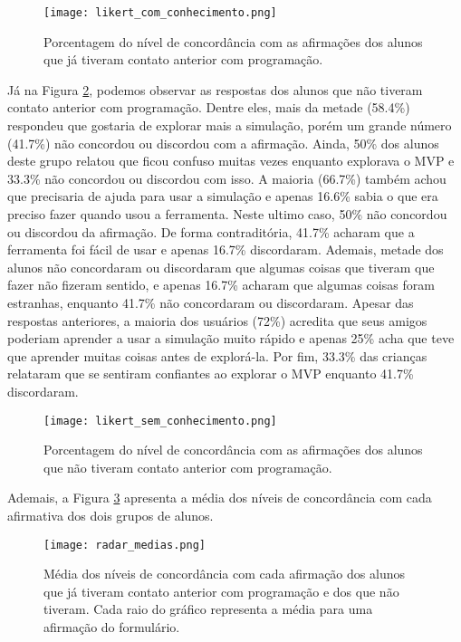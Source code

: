 \begin{figure}[h!]
    \centering
    \texttt{[image: likert\_com\_conhecimento.png]}
    \caption{Porcentagem do nível de concordância com as afirmações dos alunos que já tiveram contato anterior com programação.}
    \label{figure:likert_sim}
\end{figure}

Já na Figura \ref{figure:likert_nao}, podemos observar as respostas dos alunos que não tiveram contato anterior com programação. Dentre eles, mais da metade (58.4\%) respondeu que gostaria de explorar mais a simulação, porém um grande número (41.7\%) não concordou ou discordou com a afirmação. Ainda, 50\% dos alunos deste grupo relatou que ficou confuso muitas vezes enquanto explorava o MVP e 33.3\% não concordou ou discordou com isso. A maioria (66.7\%) também achou que precisaria de ajuda para usar a simulação e apenas 16.6\% sabia o que era preciso fazer quando usou a ferramenta. Neste ultimo caso, 50\% não concordou ou discordou da afirmação. De forma contraditória, 41.7\% acharam que a ferramenta foi fácil de usar e apenas 16.7\% discordaram. Ademais, metade dos alunos não concordaram ou discordaram que algumas coisas que tiveram que fazer não fizeram sentido, e apenas 16.7\% acharam que algumas coisas foram estranhas, enquanto 41.7\% não concordaram ou discordaram. Apesar das respostas anteriores, a maioria dos usuários (72\%) acredita que seus amigos poderiam aprender a usar a simulação muito rápido e apenas 25\% acha que teve que aprender muitas coisas antes de explorá-la. Por fim, 33.3\% das crianças relataram que se sentiram confiantes ao explorar o MVP enquanto 41.7\% discordaram.

\begin{figure}[h!]
    \centering
    \texttt{[image: likert\_sem\_conhecimento.png]}
    \caption{Porcentagem do nível de concordância com as afirmações dos alunos que não tiveram contato anterior com programação.}
    \label{figure:likert_nao}
\end{figure}

Ademais, a Figura \ref{figure:radar_medias} apresenta a média dos níveis de concordância com cada afirmativa dos dois grupos de alunos.

\begin{figure}[h!]
    \centering
    \texttt{[image: radar\_medias.png]}
    \caption{Média dos níveis de concordância com cada afirmação dos alunos que já tiveram contato anterior com programação e dos que não tiveram. Cada raio do gráfico representa a média para uma afirmação do formulário.}
    \label{figure:radar_medias}
\end{figure}

